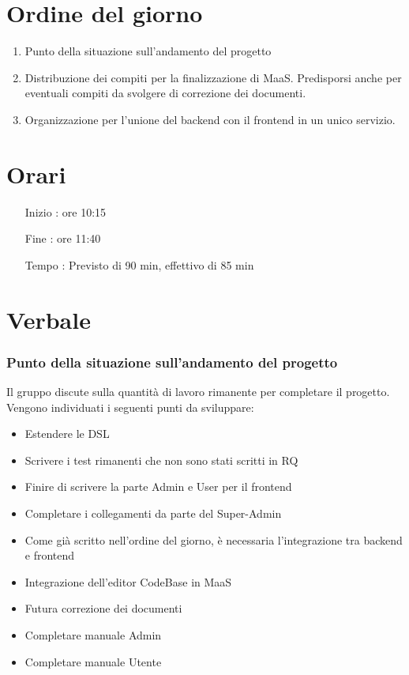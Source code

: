 \documentclass[11pt]{meetingmins}
\begin{document}
\maketitle

\section{Ordine del giorno}

\begin{enumerate}

\item Punto della situazione sull'andamento del progetto
\item Distribuzione dei compiti per la finalizzazione di MaaS. Predisporsi anche per eventuali compiti da svolgere di correzione dei documenti.
\item Organizzazione per l'unione del backend con il frontend in un unico servizio.

\end{enumerate}

\section{Orari}

\begin{itemize}
\item[Inizio]: ore 10:15
\item[Fine]: ore 11:40
\item[Tempo]: Previsto di 90 min, effettivo di 85 min

\end{itemize}

\section{Verbale}

\subsubsection{Punto della situazione sull'andamento del progetto}

Il gruppo discute sulla quantità di lavoro rimanente per completare il progetto. Vengono individuati i seguenti punti da sviluppare:
\begin{itemize}

\item Estendere le DSL
\item Scrivere i test rimanenti che non sono stati scritti in RQ
\item Finire di scrivere la parte Admin e User per il frontend
\item Completare i collegamenti da parte del Super-Admin
\item Come già scritto nell'ordine del giorno, è necessaria l'integrazione tra backend e frontend
\item Integrazione dell'editor CodeBase in MaaS
\item Futura correzione dei documenti
\item Completare manuale Admin
\item Completare manuale Utente
\end{itemize}
\end{document}
